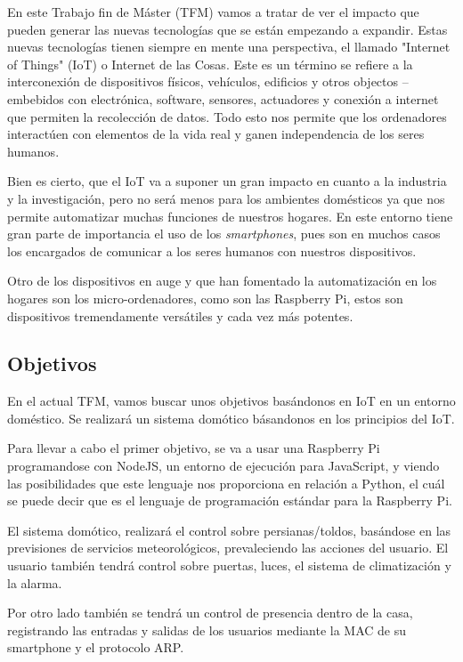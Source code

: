 \documentclass[10pt,journal,compsoc]{IEEEtran}
\begin{document}
\IEEEPARstart En este Trabajo fin de Máster (TFM) vamos a tratar de ver el impacto 
que pueden generar las nuevas tecnologías que se están empezando a expandir.
Estas nuevas tecnologías tienen siempre en mente una perspectiva, el llamado
 "Internet of Things" (IoT) o Internet de las Cosas. 
Este es un término se refiere a la interconexión de dispositivos físicos, vehículos, edificios 
y otros objectos --embebidos con electrónica, software, sensores, actuadores y conexión a 
internet que permiten la recolección de datos.
Todo esto nos permite que los ordenadores interactúen con elementos de la vida real y ganen 
independencia de los seres humanos.

Bien es cierto, que el IoT va a suponer un gran impacto en cuanto a la industria y la investigación,
 pero no será menos para los ambientes domésticos ya que nos permite automatizar muchas funciones 
 de nuestros hogares.
En este entorno tiene gran parte de importancia el uso de los \textit{smartphones}, pues son en 
muchos casos los encargados de comunicar a los seres humanos con nuestros dispositivos.

Otro de los dispositivos en auge y que han fomentado la automatización en los hogares son los 
micro-ordenadores, como son las Raspberry Pi, estos son dispositivos tremendamente versátiles 
y cada vez más potentes.


\subsection{Objetivos}
En el actual TFM, vamos buscar unos objetivos basándonos en IoT en un entorno doméstico.
Se realizará un sistema domótico básandonos en los principios del IoT.

Para llevar a cabo el primer objetivo, se va a usar una Raspberry Pi programandose con NodeJS, 
un entorno de ejecución para JavaScript, y viendo las posibilidades que este lenguaje nos 
proporciona en relación a Python, el cuál se puede decir que es el lenguaje de programación 
estándar para la Raspberry Pi.

El sistema domótico, realizará el control sobre persianas/toldos, basándose en las previsiones 
de servicios meteorológicos, prevaleciendo las acciones del usuario. El usuario también tendrá 
control sobre puertas, luces, el sistema de climatización y la alarma.

Por otro lado también se tendrá un control de presencia dentro de la casa, registrando las 
entradas y salidas de los usuarios mediante la MAC de su smartphone y el protocolo ARP. 
\end{document}
